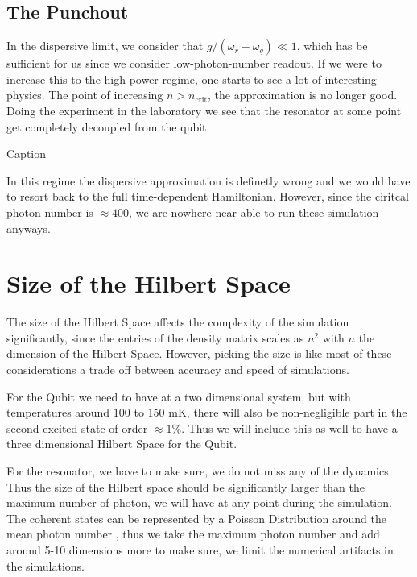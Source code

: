 \subsection{The Punchout}
In the dispersive limit, we consider that $g/(\omega_r - \omega_q) \ll 1$, which has be sufficient for us since we consider low-photon-number readout. If we were to increase this to the high power regime, one starts to see a lot of interesting physics. The point of increasing $n > n_{\text{crit}}$, the approximation is no longer good. Doing the experiment in the laboratory we see that the resonator at some point get completely decoupled from the qubit.

\begin{marginfigure}
    \centering
    \caption{Caption}
    \label{fig:experiment_punchout}
\end{marginfigure}

In this regime the dispersive approximation is definetly wrong and we would have to resort back to the full time-dependent Hamiltonian. However, since the ciritcal photon number is $\approx 400$, we are nowhere near able to run these simulation anyways. 

\section{Size of the Hilbert Space}
The size of the Hilbert Space affects the complexity of the simulation significantly, since the entries of the density matrix scales as $n^2$ with $n$ the dimension of the Hilbert Space. However, picking the size is like most of these considerations a trade off between accuracy and speed of simulations. 

For the Qubit we need to have at a two dimensional system, but with temperatures around $100$ to $150 \text{ mK}$, there will also be non-negligible part in the second excited state of order $\approx 1\%$. Thus we will include this as well to have a three dimensional Hilbert Space for the Qubit.

For the resonator, we have to make sure, we do not miss any of the dynamics. Thus the size of the Hilbert space should be significantly larger than the maximum number of photon, we will have at any point during the simulation. The coherent states can be represented by a Poisson Distribution around the mean photon number , thus we take the maximum photon number and add around 5-10 dimensions more to make sure, we limit the numerical artifacts in the simulations.

